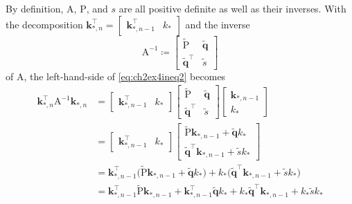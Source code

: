 \documentclass[11pt, a4paper]{scrartcl}
\newcommand{\transposed}{{\!\top\!}}
\renewcommand{\vec}[1]{\bm{#1}}
\newcommand{\mat}[1]{\bm{\mathrm{#1}}}
\begin{document}
			By definition, \(\mat{A}\), \(\mat{P}\), and \(s\) are all positive definite as well as their inverses. With the decomposition \( \vec{k}_{\ast, n}^\transposed = \begin{bmatrix} \vec{k}_{\ast, n - 1}^\transposed & k_\ast \end{bmatrix} \) and the inverse
			\begin{equation}
				\mat{A}^{-1} \coloneqq
					\begin{bmatrix}
						\tilde{\mat{P}}             & \tilde{\vec{q}} \\
						\tilde{\vec{q}}^\transposed & \tilde{s}
					\end{bmatrix}
			\end{equation}
			of \(\mat{A}\), the left-hand-side of \eqref{eq:ch2ex4ineq2} becomes
			\begin{align}
				\vec{k}_{\ast, n}^\transposed \mat{A}^{-1} \vec{k}_{\ast, n}
					&=
						\begin{bmatrix}
							\vec{k}_{\ast, n - 1}^\transposed & k_\ast
						\end{bmatrix}
						\begin{bmatrix}
							\tilde{\mat{P}}             & \tilde{\vec{q}} \\
							\tilde{\vec{q}}^\transposed & \tilde{s}
						\end{bmatrix}
						\begin{bmatrix}
							\vec{k}_{\ast, n - 1} \\
							k_\ast
						\end{bmatrix} \\
					&=
						\begin{bmatrix}
							\vec{k}_{\ast, n - 1}^\transposed & k_\ast
						\end{bmatrix}
						\begin{bmatrix}
							\tilde{\mat{P}} \vec{k}_{\ast, n - 1} + \tilde{\vec{q}} k_\ast \\
							\tilde{\vec{q}}^\transposed \vec{k}_{\ast, n - 1} + \tilde{s} k_\ast
						\end{bmatrix} \\
					&= \vec{k}_{\ast, n - 1}^\transposed \big( \tilde{\mat{P}} \vec{k}_{\ast, n - 1} + \tilde{\vec{q}} k_\ast \big) + k_\ast \big( \tilde{\vec{q}}^\transposed \vec{k}_{\ast, n - 1} + \tilde{s} k_\ast \big) \\
					&= \vec{k}_{\ast, n - 1}^\transposed \tilde{\mat{P}} \vec{k}_{\ast, n - 1} + \vec{k}_{\ast, n - 1}^\transposed \tilde{\vec{q}} k_\ast + k_\ast \tilde{\vec{q}}^\transposed \vec{k}_{\ast, n - 1} + k_\ast \tilde{s} k_\ast \\

\end{align}
\end{document}
